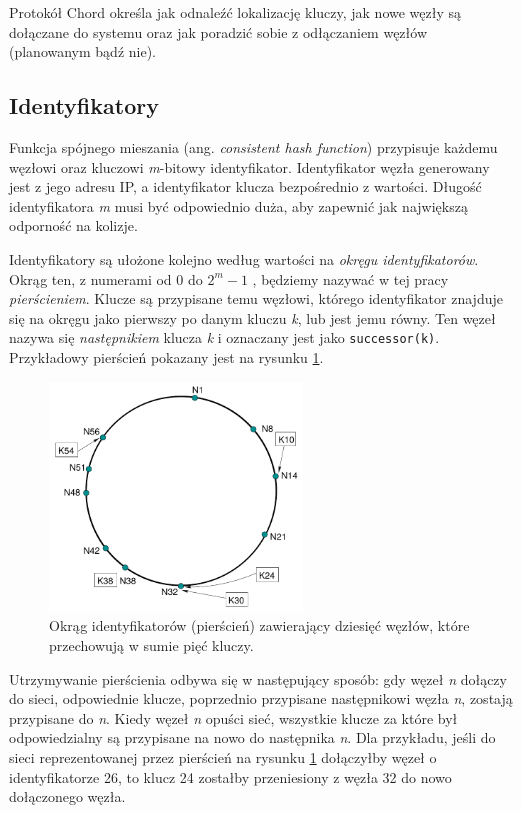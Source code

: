 \documentclass[12pt, twoside, openany]{report}
\begin{document}
Protokół Chord określa jak odnaleźć lokalizację kluczy, jak nowe węzły są dołączane do systemu oraz jak poradzić sobie z odłączaniem węzłów (planowanym bądź nie).

\subsection{Identyfikatory}
\label{ch_ch_id}

Funkcja spójnego mieszania (ang. \textit{consistent hash function}) przypisuje każdemu węzłowi oraz kluczowi \textit{m}-bitowy identyfikator. Identyfikator węzła generowany jest z jego adresu IP, a identyfikator klucza bezpośrednio z wartości. Długość identyfikatora \textit{m} musi być odpowiednio duża, aby zapewnić jak największą odporność na kolizje.

Identyfikatory są ułożone kolejno według wartości na \textit{okręgu identyfikatorów}. Okrąg ten, z numerami od $0$ do  $2^m-1$ , będziemy nazywać w tej pracy \textit{pierścieniem}. Klucze są przypisane temu węzłowi, którego identyfikator znajduje się na okręgu jako pierwszy po danym kluczu \textit{k}, lub jest jemu równy. Ten węzeł nazywa się \textit{następnikiem} klucza \textit{k} i oznaczany jest jako \texttt{successor(k)}. Przykładowy pierścień pokazany jest na rysunku \ref{fig:pierscien}.

\begin{figure}[H]
\centering
\includegraphics[width=0.6\textwidth,height=\textheight,keepaspectratio]{ring.png}
\caption{Okrąg identyfikatorów (pierścień) zawierający dziesięć węzłów, które przechowują w sumie pięć kluczy.}
\label{fig:pierscien}
\end{figure}

Utrzymywanie pierścienia odbywa się w następujący sposób: gdy węzeł \textit{n} dołączy do sieci, odpowiednie klucze, poprzednio przypisane następnikowi węzła \textit{n}, zostają przypisane do \textit{n}. Kiedy węzeł \textit{n} opuści sieć, wszystkie klucze za które był odpowiedzialny są przypisane na nowo do następnika \textit{n}. Dla przykładu, jeśli do sieci reprezentowanej przez pierścień na rysunku \ref{fig:pierscien} dołączyłby węzeł o identyfikatorze 26, to klucz 24 zostałby przeniesiony z węzła 32 do nowo dołączonego węzła.
\end{document}
